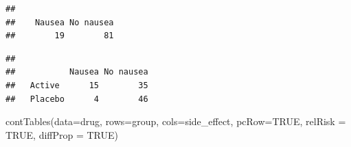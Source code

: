 \documentclass[
]{memoir}
\newenvironment{Shaded}{\begin{snugshade}}{\end{snugshade}}
\newcommand{\AttributeTok}[1]{\textcolor[rgb]{0.77,0.63,0.00}{#1}}
\newcommand{\ConstantTok}[1]{\textcolor[rgb]{0.00,0.00,0.00}{#1}}
\newcommand{\FunctionTok}[1]{\textcolor[rgb]{0.00,0.00,0.00}{#1}}
\newcommand{\NormalTok}[1]{#1}
\newcommand{\SpecialCharTok}[1]{\textcolor[rgb]{0.00,0.00,0.00}{#1}}
\begin{document}
\begin{verbatim}
## 
##    Nausea No nausea 
##        19        81
\end{verbatim}

\begin{Shaded}
\end{Shaded}

\begin{verbatim}
##          
##           Nausea No nausea
##   Active      15        35
##   Placebo      4        46
\end{verbatim}

\begin{Shaded}
\begin{Highlighting}[]
\FunctionTok{contTables}\NormalTok{(}\AttributeTok{data=}\NormalTok{drug, }\AttributeTok{rows=}\NormalTok{group, }\AttributeTok{cols=}\NormalTok{side\_effect, }\AttributeTok{pcRow=}\ConstantTok{TRUE}\NormalTok{, }\AttributeTok{relRisk =} \ConstantTok{TRUE}\NormalTok{, }\AttributeTok{diffProp =} \ConstantTok{TRUE}\NormalTok{)}
\end{Highlighting}
\end{Shaded}
\end{document}
